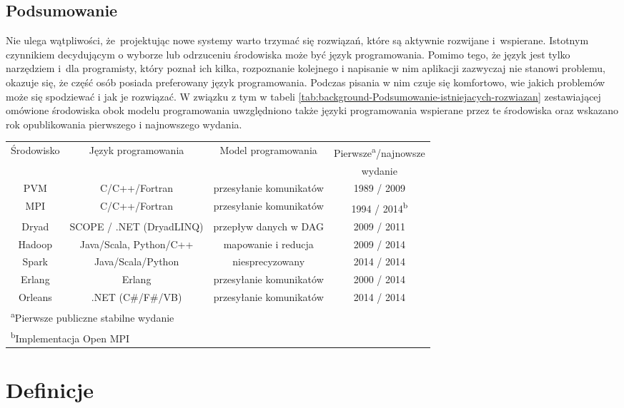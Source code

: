 \subsection{Podsumowanie}

Nie ulega wątpliwości, że~projektując nowe systemy warto trzymać
się rozwiązań, które są aktywnie rozwijane i~wspierane. Istotnym
czynnikiem decydującym o wyborze lub odrzuceniu środowiska może być
język programowania. Pomimo tego, że język jest tylko narzędziem i~dla
programisty, który poznał ich kilka, rozpoznanie kolejnego i napisanie
w nim aplikacji zazwyczaj nie stanowi problemu, okazuje się, że część
osób posiada preferowany język programowania. Podczas pisania w nim
czuje się komfortowo, wie jakich problemów może się spodziewać i jak
je rozwiązać. W związku z tym w tabeli \ref{tab:background-Podsumowanie-istniejacych-rozwiazan}
zestawiającej omówione środowiska obok modelu programowania uwzględniono
także języki programowania wspierane przez te środowiska oraz wskazano
rok opublikowania pierwszego i najnowszego wydania.

\begin{sidewaystable}
\centering{}\protect\caption{\label{tab:background-Podsumowanie-istniejacych-rozwiazan}Porównanie
wybranych środowisk przetwarzania rozproszonego}
\begin{tabular}{|c|c|c|c|}
\hline 
Środowisko & Język programowania & Model programowania & Pierwsze\textsuperscript{a}/najnowsze\tabularnewline
 &  &  & wydanie\tabularnewline
\hline 
\hline 
PVM & C/C++/Fortran & przesyłanie komunikatów & 1989 / 2009\tabularnewline
\hline 
MPI & C/C++/Fortran & przesyłanie komunikatów & 1994 / 2014\textsuperscript{b}\tabularnewline
\hline 
Dryad & SCOPE / .NET (DryadLINQ) & przepływ danych w DAG & 2009 / 2011\tabularnewline
\hline 
Hadoop & Java/Scala, Python/C++ \cite{Hadoop-Python} & mapowanie i reducja & 2009 / 2014\tabularnewline
\hline 
Spark & Java/Scala/Python & niesprecyzowany & 2014 / 2014\tabularnewline
\hline 
Erlang & Erlang & przesyłanie komunikatów & 2000 / 2014\tabularnewline
\hline 
Orleans & .NET (C\#/F\#/VB) & przesyłanie komunikatów & 2014 / 2014\tabularnewline
\hline 
\multicolumn{4}{l}{\textsuperscript{a}Pierwsze publiczne stabilne wydanie}\tabularnewline
\multicolumn{4}{l}{\textsuperscript{b}Implementacja Open MPI}\tabularnewline
\end{tabular}
\end{sidewaystable}



\section{Definicje}


